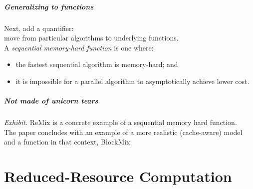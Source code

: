 \documentclass[aspectratio=43]{beamer}
\newenvironment{changemargin}[1]{%
  \begin{list}{}{%
    \setlength{\topsep}{0pt}%
    \setlength{\leftmargin}{#1}%
    \setlength{\rightmargin}{1em}
    \setlength{\listparindent}{\parindent}%
    \setlength{\itemindent}{\parindent}%
    \setlength{\parsep}{\parskip}%
  }%
  \item[]}{\end{list}}
\begin{document}
\begin{frame}
  \frametitle{Generalizing to functions}
  \begin{changemargin}{2cm}
    Next, add a quantifier: \\move from particular algorithms to underlying functions.\\[1em]
    A \emph{sequential memory-hard function} is one where:

    \begin{itemize}
      \item the fastest
        sequential algorithm is memory-hard; and
      \item it is impossible for a
        parallel algorithm to asymptotically achieve lower cost.
    \end{itemize}
  \end{changemargin}
\end{frame}

\begin{frame}
  \frametitle{Not made of unicorn tears}
  \begin{changemargin}{2cm}
    \emph{Exhibit.} ReMix is a concrete example of a sequential memory hard function.\\[1em]
    The paper concludes with an example of a more realistic (cache-aware) model and
    a function in that context, BlockMix.
  \end{changemargin}
\end{frame}

\part{Reduced-Resource Computation}
\frame{\partpage}
\end{document}
